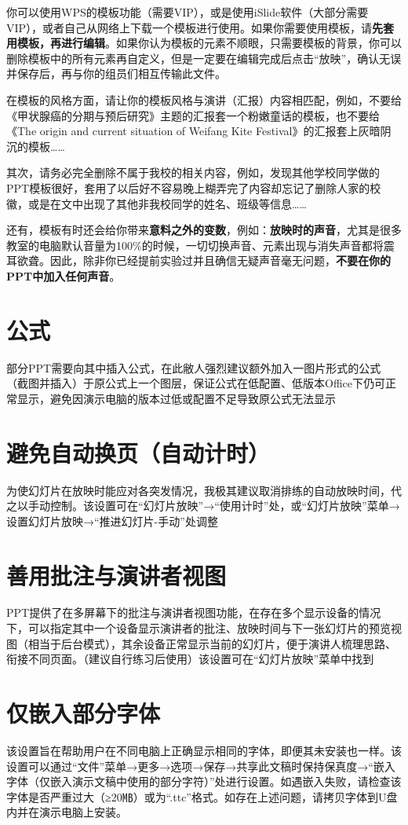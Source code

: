 你可以使用WPS的模板功能（需要VIP），或是使用iSlide软件（大部分需要VIP），或者自己从网络上下载一个模板进行使用。如果你需要使用模板，请\textbf{先套用模板，再进行编辑}。如果你认为模板的元素不顺眼，只需要模板的背景，你可以删除模板中的所有元素再自定义，但是一定要在编辑完成后点击“放映”，确认无误并保存后，再与你的组员们相互传输此文件。

在模板的风格方面，请让你的模板风格与演讲（汇报）内容相匹配，例如，不要给《甲状腺癌的分期与预后研究》主题的汇报套一个粉嫩童话的模板，也不要给《The origin and current situation of Weifang Kite Festival》的汇报套上灰暗阴沉的模板……

其次，请务必完全删除不属于我校的相关内容，例如，发现其他学校同学做的PPT模板很好，套用了以后好不容易晚上糊弄完了内容却忘记了删除人家的校徽，或是在文中出现了其他非我校同学的姓名、班级等信息……

还有，模板有时还会给你带来\textbf{意料之外的变数}，例如：\textbf{放映时的声音}，尤其是很多教室的电脑默认音量为100\%的时候，一切切换声音、元素出现与消失声音都将震耳欲聋。因此，除非你已经提前实验过并且确信无疑声音毫无问题，\textbf{不要在你的PPT中加入任何声音}。

\section[公式]{公式}
部分PPT需要向其中插入公式，在此敝人强烈建议额外加入一图片形式的公式（截图并插入）于原公式上一个图层，保证公式在低配置、低版本Office下仍可正常显示，避免因演示电脑的版本过低或配置不足导致原公式无法显示

\section[避免自动换页（自动计时）]{避免自动换页（自动计时）}
为使幻灯片在放映时能应对各突发情况，我极其建议取消排练的自动放映时间，代之以手动控制。该设置可在“幻灯片放映”→“使用计时”处，或“幻灯片放映”菜单→设置幻灯片放映→“推进幻灯片-手动”处调整

\section[善用批注与演讲者视图]{善用批注与演讲者视图}
PPT提供了在多屏幕下的批注与演讲者视图功能，在存在多个显示设备的情况下，可以指定其中一个设备显示演讲者的批注、放映时间与下一张幻灯片的预览视图（相当于后台模式），其余设备正常显示当前的幻灯片，便于演讲人梳理思路、衔接不同页面。（建议自行练习后使用）该设置可在“幻灯片放映”菜单中找到

\section[仅嵌入部分字体]{仅嵌入部分字体}
该设置旨在帮助用户在不同电脑上正确显示相同的字体，即便其未安装也一样。该设置可以通过“文件”菜单→更多→选项→保存→共享此文稿时保持保真度→“嵌入字体（仅嵌入演示文稿中使用的部分字符）”处进行设置。如遇嵌入失败，请检查该字体是否严重过大（≥20㎆）或为“.ttc”格式。如存在上述问题，请拷贝字体到U盘内并在演示电脑上安装。

